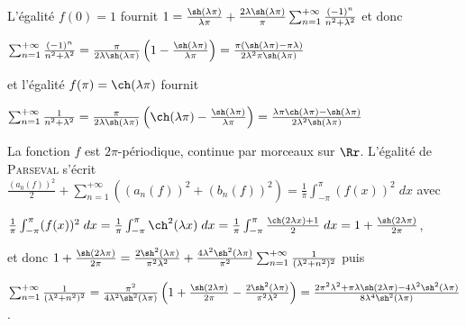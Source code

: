 {{L'égalité $f(0)=1$ fournit $1=\frac{\sh(\lambda\pi)}{\lambda\pi}+\frac{2\lambda\sh(\lambda\pi)}{\pi}\sum_{n=1}^{+\infty}\frac{(-1)^n}{n^2+\lambda^2}$ et donc

\begin{center}
$\sum_{n=1}^{+\infty}\frac{(-1)^n}{n^2+\lambda^2}=\frac{\pi}{2\lambda\sh(\lambda\pi)}\left(1-\frac{\sh(\lambda\pi)}{\lambda\pi}\right)=\frac{\pi\left(\sh(\lambda\pi)-\pi\lambda\right)}{2\lambda^2\pi\sh(\lambda\pi)}$
\end{center}

et l'égalité $f(\pi)=\ch(\lambda\pi)$ fournit 

\begin{center}
$\sum_{n=1}^{+\infty}\frac{1}{n^2+\lambda^2}=\frac{\pi}{2\lambda\sh(\lambda\pi)}\left(\ch(\lambda\pi)-\frac{\sh(\lambda\pi)}{\lambda\pi}\right)=\frac{\lambda\pi\ch(\lambda\pi)-\sh(\lambda\pi)}{2\lambda^2\sh(\lambda\pi)}$
\end{center}

\begin{center}
\end{center}

La fonction $f$ est $2\pi$-périodique, continue par morceaux sur $\Rr$. L'égalité de \textsc{Parseval} s'écrit $\frac{(a_0(f))^2}{2}+\sum_{n=1}^{+\infty}((a_n(f))^2+(b_n(f))^2)=\frac{1}{\pi}\int_{-\pi}^{\pi}(f(x))^2\;dx$ avec

\begin{center}
$\frac{1}{\pi}\int_{-\pi}^{\pi}(f(x))^2\;dx=\frac{1}{\pi}\int_{-\pi}^{\pi}\ch^2(\lambda x)\;dx=\frac{1}{\pi}\int_{-\pi}^{\pi}\frac{\ch(2\lambda x)+1}{2}\;dx=1+\frac{\sh(2\lambda\pi)}{2\pi}$,
\end{center}

et donc $1+\frac{\sh(2\lambda\pi)}{2\pi}=\frac{2\sh^2(\lambda\pi)}{\pi^2\lambda^2}+\frac{4\lambda^2\sh^2(\lambda\pi)}{\pi^2}\sum_{n=1}^{+\infty}\frac{1}{(\lambda^2+n^2)^2}$ puis

\begin{center}
$\sum_{n=1}^{+\infty}\frac{1}{(\lambda^2+n^2)^2}=\frac{\pi^2}{4\lambda^2\sh^2(\lambda\pi)}\left(1+\frac{\sh(2\lambda\pi)}{2\pi}-\frac{2\sh^2(\lambda\pi)}{\pi^2\lambda^2}\right)=\frac{2\pi^2\lambda^2+\pi\lambda\sh(2\lambda\pi)-4\lambda^2\sh^2(\lambda\pi)}{8\lambda^4\sh^2(\lambda\pi)}$.
\end{center}

}}
